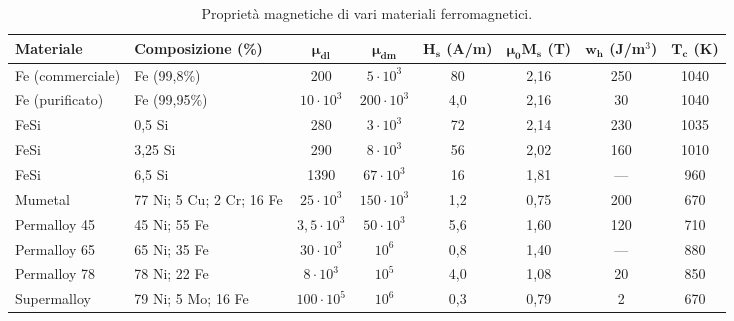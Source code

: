 \documentclass[../main.tex]{subfiles}
\begin{document}
	\begin{table}[h]
		\centering
		\label{tab:proprieta_ferromagnetici}
		\begin{tabular}{llcccccc}
			\hline
			\textbf{Materiale} & \textbf{Composizione (\%)} & $\boldsymbol{\mu_{\text{dl}}}$ & $\boldsymbol{\mu_{\text{dm}}}$ & $\boldsymbol{H_s}$ (A/m) & $\boldsymbol{\mu_0 M_s}$ (T) & $\boldsymbol{w_h}$ (J/m$^3$) & $\boldsymbol{T_c}$ (K) \\ \hline
			Fe (commerciale) & Fe (99,8\%) & 200 & $5 \cdot 10^3$ & 80 & 2,16 & 250 & 1040 \\
			Fe (purificato) & Fe (99,95\%) & $10 \cdot 10^3$ & $200 \cdot 10^3$ & 4,0 & 2,16 & 30 & 1040 \\
			FeSi & 0,5 Si & 280 & $3 \cdot 10^3$ & 72 & 2,14 & 230 & 1035 \\
			FeSi & 3,25 Si & 290 & $8 \cdot 10^3$ & 56 & 2,02 & 160 & 1010 \\
			FeSi & 6,5 Si & 1390 & $67 \cdot 10^3$ & 16 & 1,81 & — & 960 \\
			Mumetal & 77 Ni; 5 Cu; 2 Cr; 16 Fe & $25 \cdot 10^3$ & $150 \cdot 10^3$ & 1,2 & 0,75 & 200 & 670 \\
			Permalloy 45 & 45 Ni; 55 Fe & $3,5 \cdot 10^3$ & $50 \cdot 10^3$ & 5,6 & 1,60 & 120 & 710 \\
			Permalloy 65 & 65 Ni; 35 Fe & $30 \cdot 10^3$ & $10^6$ & 0,8 & 1,40 & — & 880 \\
			Permalloy 78 & 78 Ni; 22 Fe & $8 \cdot 10^3$ & $10^5$ & 4,0 & 1,08 & 20 & 850 \\
			Supermalloy & 79 Ni; 5 Mo; 16 Fe & $100 \cdot 10^5$ & $10^6$ & 0,3 & 0,79 & 2 & 670 \\ \hline
		\end{tabular}
		\caption{Proprietà magnetiche di vari materiali ferromagnetici.}
	\end{table}
\end{document}
